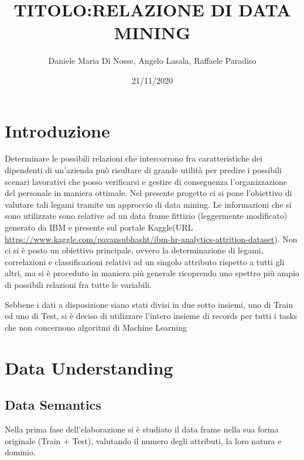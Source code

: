 \documentclass[english]{article}
\begin{document}
\title{TITOLO:RELAZIONE DI DATA MINING}
\author{Daniele Maria Di Nosse, Angelo Lasala, Raffaele Paradiso}
\date{21/11/2020\newpage}

\maketitle
\tableofcontents{}

\newpage

\section{Introduzione}
Determinare le possibili relazioni che intercorrono fra caratteristiche dei dipendenti di un'azienda può risultare di grande utilità per predire i possibili scenari lavorativi che posso verificarsi e gestire di conseguenza l'organizzazione del personale in maniera ottimale. Nel presente progetto ci si pone l'obiettivo di valutare tali legami tramite un approccio di data mining. Le informazioni che si sono utilizzate sono relative ad un data frame fittizio (leggermente modificato) generato da IBM e presente sul portale Kaggle(URL \url{https://www.kaggle.com/pavansubhasht/ibm-hr-analytics-attrition-dataset}). Non ci si è posto un obiettivo principale, ovvero la determinazione di legami, correlazioni e classificazioni relativi ad un singolo attributo rispetto a tutti gli altri, ma si è proceduto in maniera più generale ricoprendo uno spettro più ampio di possibili relazioni fra tutte le variabili.

Sebbene i dati a disposizione siano stati divisi in due sotto insiemi, uno di Train ed uno di Test, si è deciso di utilizzare l'intero insieme di records per tutti i tasks che non concernono algoritmi di Machine Learning
\section{Data Understanding}
\subsection{Data Semantics}
Nella prima fase dell'elaborazione si è studiato il data frame nella sua forma originale (Train + Test), valutando il numero degli attributi, la loro natura e dominio. 

\end{document}
